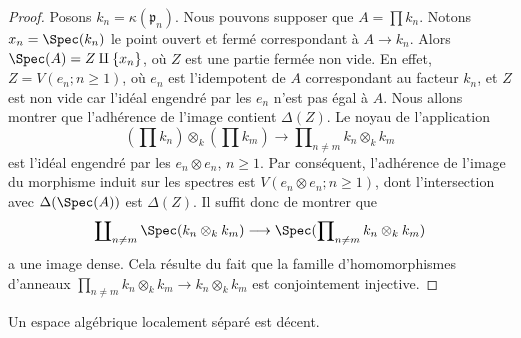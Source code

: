 \begin{proof}
Posons $k_n = \kappa(\mathfrak p_n)$. Nous pouvons supposer que
$A = \prod k_n$. Notons $x_n = \Spec(k_n)$ le point ouvert et fermé
correspondant à $A \to k_n$. Alors $\Spec(A) = Z \amalg \{x_n\}$, où $Z$
est une partie fermée non vide. En effet, $Z = V(e_n; n \geq 1)$, où $e_n$
est l'idempotent de $A$ correspondant au facteur $k_n$, et $Z$ est non vide
car l'idéal engendré par les $e_n$ n'est pas égal à $A$. Nous allons montrer
que l'adhérence de l'image contient $\Delta(Z)$. Le noyau de l'application
$$
(\prod k_n) \otimes_k (\prod k_m)
\longrightarrow
\prod\nolimits_{n \not = m} k_n \otimes_k k_m
$$
est l'idéal engendré par les $e_n \otimes e_n$, $n \geq 1$.
Par conséquent, l'adhérence de l'image du morphisme induit sur les spectres
est $V(e_n \otimes e_n; n \geq 1)$, dont l'intersection avec
$\Delta(\Spec(A))$ est $\Delta(Z)$. Il suffit donc de montrer que
$$
\coprod\nolimits_{n \not = m} \Spec(k_n \otimes_k k_m)
\longrightarrow
\Spec(\prod\nolimits_{n \not = m} k_n \otimes_k k_m)
$$
a une image dense. Cela résulte du fait que la famille d'homomorphismes
d'anneaux
$\prod_{n \not = m} k_n \otimes_k k_m \to k_n \otimes_k k_m$
est conjointement injective.
\end{proof}

\begin{lemma}
\label{lemma-locally-separated-decent}
Un espace algébrique localement séparé est décent.
\end{lemma}

